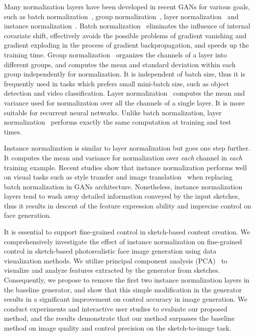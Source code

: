 \documentclass[10pt,twocolumn,letterpaper]{article}
\begin{document}
Many normalization layers have been developed in recent GANs for various goals, such as batch normalization~\cite{bn}, group normalization~\cite{gn}, layer normalization~\cite{ln} and instance normalization~\cite{instance_norm}. 
Batch normalization~\cite{bn} eliminates the influence of internal covariate shift, effectively avoids the possible problems of gradient vanishing and gradient exploding in the process of gradient backpropagation, and speeds up the training time. 
Group normalization~\cite{gn} organizes the channels of a layer into different groups, and computes the mean and standard deviation within each group independently for normalization. It is independent of batch size, thus it is frequently used in tasks which prefers small mini-batch size, such as object detection and video classification.
Layer normalization~\cite{ln} computes the mean and variance used for normalization over all the channels of a single layer. It is more suitable for recurrent neural networks. Unlike batch normalization, layer normalization~\cite{instance_norm} performs exactly the same computation at training and test times.

Instance normalization is similar to layer normalization but goes one step further. It computes the mean and variance for normalization over \emph{each} channel in \emph{each} training example.
Recent studies show that instance normalization performs well on visual tasks such as style transfer and image translation~\cite{pix2pixhd,spade,cyclegan} when replacing batch normalization in GANs architecture. 
Nonetheless, instance normalization layers tend to wash away detailed information conveyed by the input sketches, thus it results in descent of the feature expression ability and imprecise control on face generation. 

It is essential to support fine-grained control in sketch-based content creation. 
We comprehensively investigate the effect of instance normalization on fine-grained control in sketch-based photorealistic face image generation using data visualization methods. 
We utilize principal component analysis (PCA)~\cite{pca} to visualize and analyze features extracted by the generator from sketches. 
Consequently, we propose to remove the first two instance normalization layers in the baseline generator, and show that this simple modification in the generator results in a significant improvement on control accuracy in image generation. 
We conduct experiments and interactive user studies to evaluate our proposed method, and the results demonstrate that our method surpasses the baseline method on image quality and control precision on the sketch-to-image task.
\end{document}
